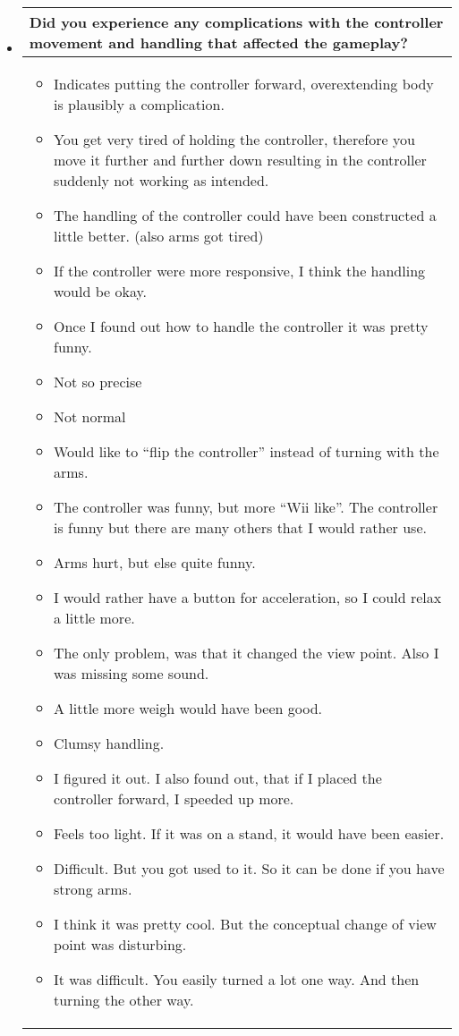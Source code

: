 \begin{itemize}
\item[]
\begin{table}[!htb]
\centering
\begin{tabular}{| p{5.5in} |}
\hline
	\cellcolor{NotSkyBlue}\textbf{Did you experience any complications with the controller movement and handling that affected the gameplay?}
	\\
	\hline
	\begin{itemize}
        \item Indicates putting the controller forward, overextending body is plausibly a complication.
        \item You get very tired of holding the controller, therefore you move it further and further down resulting in the controller suddenly not working as intended.
        \item The handling of the controller could have been constructed a little better. (also arms got tired)
        \item If the controller were more responsive, I think the handling would be okay.
        \item Once I found out how to handle the controller it was pretty funny.
        \item Not so precise
        \item Not normal
        \item Would like to “flip the controller” instead of turning with the arms.
        \item The controller was funny, but more “Wii like”. The controller is funny but there are many others that I would rather use.
        \item Arms hurt, but else quite funny.
        \item I would rather have a button for acceleration, so I could relax a little more.
        \item The only problem, was that it changed the view point. Also I was missing some sound.
        \item A little more weigh would have been good.
        \item Clumsy handling.
        \item I figured it out. I also found out, that if I placed the controller forward, I speeded up more.
        \item Feels too light. If it was on a stand, it would have been easier.
        \item Difficult. But you got used to it. So it can be done if you have strong arms.
        \item I think it was pretty cool. But the conceptual change of view point was disturbing. 
        \item It was difficult. You easily turned a lot one way. And then turning the other way.


\end{itemize}
\end{tabular}
\end{table}
\end{itemize}
